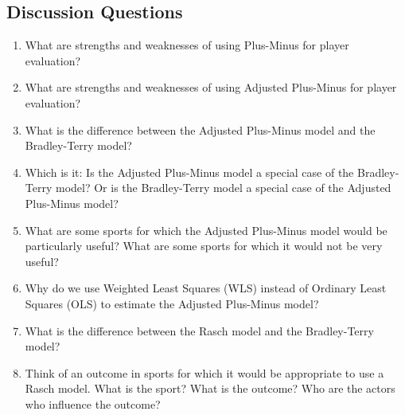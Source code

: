\documentclass{article}
\begin{document}
  \subsection{\sc Discussion Questions}

  \begin{enumerate}
    \item What are strengths and weaknesses of using Plus-Minus for player evaluation?
    \item What are strengths and weaknesses of using Adjusted Plus-Minus for player evaluation?
    \item What is the difference between the Adjusted Plus-Minus model and the Bradley-Terry model?
    \item Which is it: Is the Adjusted Plus-Minus model a special case of the Bradley-Terry model? Or is the Bradley-Terry model a special case of the Adjusted Plus-Minus model?
    \item What are some sports for which the Adjusted Plus-Minus model would be particularly useful? What are some sports for which it would not be very useful?
    \item Why do we use Weighted Least Squares (WLS) instead of Ordinary Least Squares (OLS) to estimate the Adjusted Plus-Minus model?
    \item What is the difference between the Rasch model and the Bradley-Terry model?
    \item Think of an outcome in sports for which it would be appropriate to use a Rasch model. What is the sport? What is the outcome? Who are the actors who influence the outcome?
  \end{enumerate}
\end{document}
